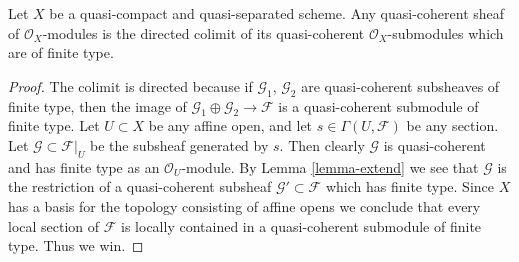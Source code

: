 \begin{lemma}
\label{lemma-quasi-coherent-colimit-finite-type}
Let $X$ be a quasi-compact and quasi-separated scheme.
Any quasi-coherent sheaf of $\mathcal{O}_X$-modules
is the directed colimit of its quasi-coherent
$\mathcal{O}_X$-submodules which are of finite type.
\end{lemma}

\begin{proof}
The colimit is directed because if $\mathcal{G}_1$, $\mathcal{G}_2$
are quasi-coherent subsheaves of finite type, then the image of
$\mathcal{G}_1 \oplus \mathcal{G}_2 \to \mathcal{F}$ is
a quasi-coherent submodule of finite type.
Let $U \subset X$ be any affine open, and let
$s \in \Gamma(U, \mathcal{F})$ be any section.
Let $\mathcal{G} \subset \mathcal{F}|_U$ be the
subsheaf generated by $s$. Then clearly $\mathcal{G}$
is quasi-coherent and has finite type as an $\mathcal{O}_U$-module.
By Lemma \ref{lemma-extend} we see that $\mathcal{G}$ is the restriction
of a quasi-coherent subsheaf $\mathcal{G}' \subset \mathcal{F}$
which has finite type. Since $X$ has a basis for the topology consisting
of affine opens we conclude that every local section of
$\mathcal{F}$ is locally contained in a quasi-coherent submodule
of finite type. Thus we win.
\end{proof}
